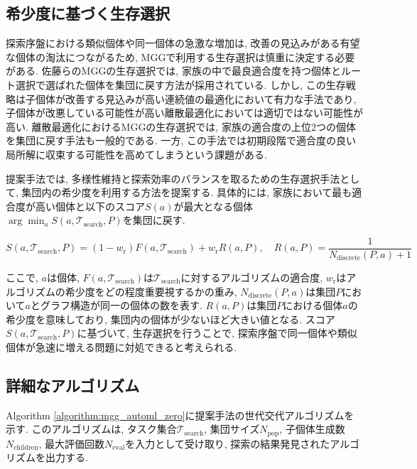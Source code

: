 \documentclass[11pt,oneside,openany,report]{jsbook}
\begin{document}
\subsection{希少度に基づく生存選択} \label{subsec:prposed:diversity:survival_selection}
探索序盤における類似個体や同一個体の急激な増加は, 改善の見込みがある有望な個体の淘汰につながるため, MGGで利用する生存選択は慎重に決定する必要がある. 佐藤らのMGGの生存選択では, 家族の中で最良適合度を持つ個体とルート選択で選ばれた個体を集団に戻す方法が採用されている\cite{mgg}. しかし, この生存戦略は子個体が改善する見込みが高い連続値の最適化において有力な手法であり, 子個体が改悪している可能性が高い離散最適化においては適切ではない可能性が高い. 離散最適化におけるMGGの生存選択では, 家族の適合度の上位2つの個体を集団に戻す手法も一般的である. 一方, この手法では初期段階で適合度の良い局所解に収束する可能性を高めてしまうという課題がある.

提案手法では, 多様性維持と探索効率のバランスを取るための生存選択手法として, 集団内の希少度を利用する方法を提案する. 具体的には, 家族において最も適合度が高い個体と以下のスコア$S(a)$が最大となる個体$\arg \min_a S(a, \mathcal{T}_\mathrm{search}, P)$を集団に戻す.

$$
 S(a, \mathcal{T}_\mathrm{search}, P) = (1-w_\mathrm{r}) F(a, \mathcal{T}_\mathrm{search}) + w_\mathrm{r} R(a, P), \quad
 R(a, P) = \frac{1}{N_{\mathrm{discrete}}(P, a) + 1}
$$

\noindent
ここで, $a$は個体, $F(a, \mathcal{T}_\mathrm{search})$は$\mathcal{T}_\mathrm{search}$に対するアルゴリズムの適合度, $w_\mathrm{r}$はアルゴリズムの希少度をどの程度重要視するかの重み, $N_\mathrm{discrete}(P, a)$は集団$P$において$a$とグラフ構造が同一の個体の数を表す. $R(a, P)$は集団$P$における個体$a$の希少度を意味しており, 集団内の個体が少ないほど大きい値となる. スコア$S(a, \mathcal{T}_\mathrm{search}, P)$に基づいて, 生存選択を行うことで, 探索序盤で同一個体や類似個体が急速に増える問題に対処できると考えられる.

\subsection{詳細なアルゴリズム}
Algorithm \ref{algorithm:mgg_automl_zero}に提案手法の世代交代アルゴリズムを示す. このアルゴリズムは, タスク集合$\mathcal{T}_\mathrm{search}$, 集団サイズ$N_\mathrm{pop}$, 子個体生成数$N_\mathrm{children}$, 最大評価回数$ N_\mathrm{eval}$を入力として受け取り, 探索の結果発見されたアルゴリズムを出力する.
\end{document}
